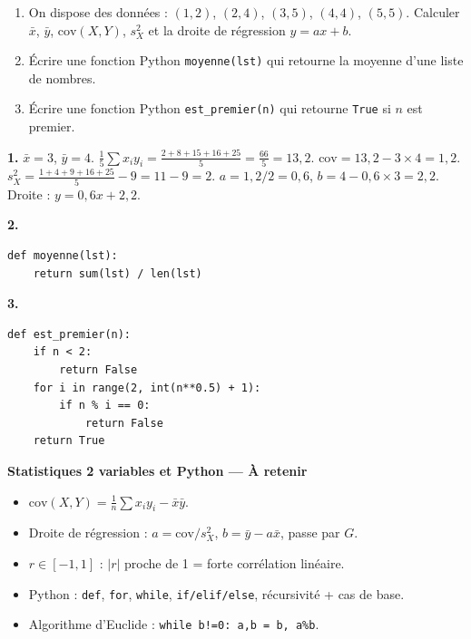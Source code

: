 \documentclass[11pt,a4paper,twoside]{book}
\begin{document}
\begin{exercicebox}
\begin{enumerate}
  \item On dispose des données : $(1,2)$, $(2,4)$, $(3,5)$, $(4,4)$, $(5,5)$.
    Calculer $\bar{x}$, $\bar{y}$, $\mathrm{cov}(X,Y)$, $s_X^2$ et la droite de régression $y=ax+b$.
  \item Écrire une fonction Python \texttt{moyenne(lst)} qui retourne la moyenne d'une liste de nombres.
  \item Écrire une fonction Python \texttt{est\_premier(n)} qui retourne \texttt{True} si $n$ est premier.
\end{enumerate}
\end{exercicebox}

\begin{correctionbox}[Correction]
\textbf{1.} $\bar{x}=3$, $\bar{y}=4$. $\frac{1}{5}\sum x_iy_i=\frac{2+8+15+16+25}{5}=\frac{66}{5}=13{,}2$.
$\mathrm{cov}=13{,}2-3\times4=1{,}2$. $s_X^2=\frac{1+4+9+16+25}{5}-9=11-9=2$.
$a=1{,}2/2=0{,}6$, $b=4-0{,}6\times3=2{,}2$. Droite : $y=0{,}6x+2{,}2$.

\textbf{2.}
\begin{verbatim}
def moyenne(lst):
    return sum(lst) / len(lst)
\end{verbatim}

\textbf{3.}
\begin{verbatim}
def est_premier(n):
    if n < 2:
        return False
    for i in range(2, int(n**0.5) + 1):
        if n % i == 0:
            return False
    return True
\end{verbatim}
\end{correctionbox}

\begin{retenirbox}
\textbf{Statistiques 2 variables et Python — À retenir}
\begin{itemize}
  \item $\mathrm{cov}(X,Y)=\frac{1}{n}\sum x_iy_i - \bar{x}\bar{y}$.
  \item Droite de régression : $a=\mathrm{cov}/s_X^2$, $b=\bar{y}-a\bar{x}$, passe par $G$.
  \item $r\in[-1,1]$ : $|r|$ proche de 1 = forte corrélation linéaire.
  \item Python : \texttt{def}, \texttt{for}, \texttt{while}, \texttt{if/elif/else}, récursivité + cas de base.
  \item Algorithme d'Euclide : \texttt{while b!=0: a,b = b, a\%b}.
\end{itemize}
\end{retenirbox}
\end{document}
